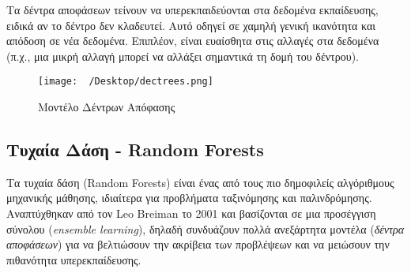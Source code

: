 \documentclass[diploma]{softlab-thesis}
\begin{document}
\begin{enumerate}
Τα δέντρα αποφάσεων τείνουν να υπερεκπαιδεύονται στα δεδομένα εκπαίδευσης, ειδικά αν το δέντρο δεν κλαδευτεί. Αυτό οδηγεί σε χαμηλή γενική ικανότητα και απόδοση σε νέα δεδομένα. Επιπλέον, είναι ευαίσθητα στις αλλαγές στα δεδομένα (π.χ., μια μικρή αλλαγή μπορεί να αλλάξει σημαντικά τη δομή του δέντρου).
\end{enumerate}

\begin{figure}[h]
    \centering
    \texttt{[image: ~/Desktop/dectrees.png]} %
    \caption{Μοντέλο Δέντρων Απόφασης}
    \label{fig:your_image_label}
\end{figure}


\subsection{Τυχαία Δάση - Random Forests}

Τα τυχαία δάση (Random Forests) είναι ένας από τους πιο δημοφιλείς αλγόριθμους μηχανικής μάθησης, ιδιαίτερα για προβλήματα ταξινόμησης και παλινδρόμησης. Αναπτύχθηκαν από τον Leo Breiman το 2001 \cite{4} και βασίζονται σε μια προσέγγιση σύνολου (\textit{ensemble learning}), δηλαδή συνδυάζουν πολλά ανεξάρτητα μοντέλα (\textit{δέντρα αποφάσεων}) για να βελτιώσουν την ακρίβεια των προβλέψεων και να μειώσουν την πιθανότητα υπερεκπαίδευσης. 
\end{document}

